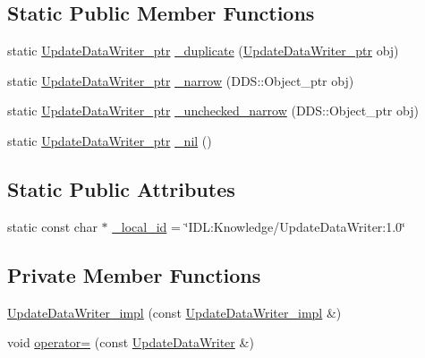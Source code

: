 \subsection*{Static Public Member Functions}
\begin{DoxyCompactItemize}
\item 
static \hyperlink{classKnowledge_1_1UpdateDataWriter}{UpdateDataWriter\_\-ptr} \hyperlink{classKnowledge_1_1UpdateDataWriter_af765e0494607134f1fbbb499e294af09}{\_\-duplicate} (\hyperlink{classKnowledge_1_1UpdateDataWriter}{UpdateDataWriter\_\-ptr} obj)
\item 
static \hyperlink{classKnowledge_1_1UpdateDataWriter}{UpdateDataWriter\_\-ptr} \hyperlink{classKnowledge_1_1UpdateDataWriter_a293fb5fce23ba55e5d49f37e7930f028}{\_\-narrow} (DDS::Object\_\-ptr obj)
\item 
static \hyperlink{classKnowledge_1_1UpdateDataWriter}{UpdateDataWriter\_\-ptr} \hyperlink{classKnowledge_1_1UpdateDataWriter_a903acf2542111e68cd1c2ae363db707f}{\_\-unchecked\_\-narrow} (DDS::Object\_\-ptr obj)
\item 
static \hyperlink{classKnowledge_1_1UpdateDataWriter}{UpdateDataWriter\_\-ptr} \hyperlink{classKnowledge_1_1UpdateDataWriter_a2261a52efe9330bb273861350a033b7f}{\_\-nil} ()
\end{DoxyCompactItemize}
\subsection*{Static Public Attributes}
\begin{DoxyCompactItemize}
\item 
static const char $\ast$ \hyperlink{classKnowledge_1_1UpdateDataWriter_a595ca0d99b00834ed9c834535e34c224}{\_\-local\_\-id} = \char`\"{}IDL:Knowledge/UpdateDataWriter:1.0\char`\"{}
\end{DoxyCompactItemize}
\subsection*{Private Member Functions}
\begin{DoxyCompactItemize}
\item 
\hyperlink{classKnowledge_1_1UpdateDataWriter__impl_a9b380a9151c9ff5879fc38d76a1a43f0}{UpdateDataWriter\_\-impl} (const \hyperlink{classKnowledge_1_1UpdateDataWriter__impl}{UpdateDataWriter\_\-impl} \&)
\item 
void \hyperlink{classKnowledge_1_1UpdateDataWriter__impl_a1e683d00d4f6f0735872be4d7042a5ad}{operator=} (const \hyperlink{classKnowledge_1_1UpdateDataWriter}{UpdateDataWriter} \&)
\end{DoxyCompactItemize}



